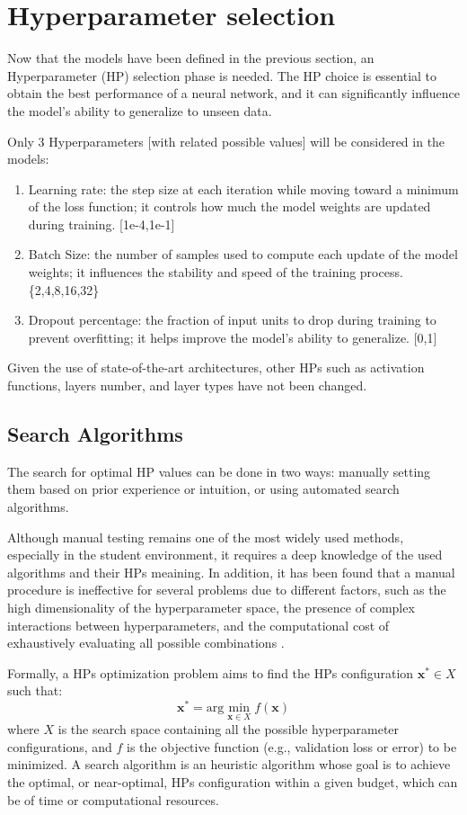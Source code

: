 \section{Hyperparameter selection}

Now that the models have been defined in the previous section, an Hyperparameter (HP) selection phase is needed.
The HP choice is essential to obtain the best performance of a neural network, and it can significantly influence the model's ability to generalize to unseen data. 

Only 3 Hyperparameters [with related possible values] will be considered in the models:
\begin{enumerate}
    \item Learning rate: the step size at each iteration while moving toward a minimum of the loss function; it controls how much the model weights are updated during training. [1e-4,1e-1]
    \item Batch Size: the number of samples used to compute each update of the model weights; it influences the stability and speed of the training process. \{2,4,8,16,32\}
    \item Dropout percentage: the fraction of input units to drop during training to prevent overfitting; it helps improve the model's ability to generalize. [0,1]
\end{enumerate}

Given the use of state-of-the-art architectures, other HPs such as activation functions, layers number, and layer types have not been changed.

\subsection{Search Algorithms}
The search for optimal HP values can be done in two ways: manually setting them based on prior experience or 
intuition, or using automated search algorithms.

Although manual testing remains one of the most widely used methods, especially in the student environment, it
requires a deep knowledge of the used algorithms and their HPs meaining. In addition, it has been found that 
a manual procedure is ineffective for several problems due to different factors, such as the high dimensionality 
of the hyperparameter space, the presence of complex interactions between hyperparameters, and the computational 
cost of exhaustively evaluating all possible combinations \cite{YANG2020295}.

Formally, a HPs optimization problem aims to find the HPs configuration $\bm{x}^* \in X$ such that:
$$ \bm{x}^* = \text{arg}\underset{\bm{x}\in X}{\min}f(\bm{x}) $$
where $X$ is the search space containing all the possible hyperparameter configurations, and $f$ is the
objective function (e.g., validation loss or error) to be minimized. A search algorithm is an heuristic algorithm
whose goal is to achieve the optimal, or near-optimal, HPs configuration within a given budget, which can be of
time or computational resources.

